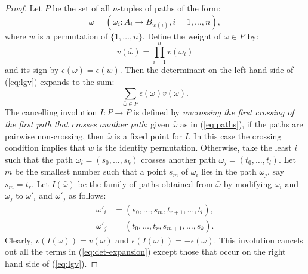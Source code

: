 \documentclass[11pt]{amsart}
\theoremstyle{definition}
\theoremstyle{example}
\begin{document}
\begin{proof}
  Let $P$ be the set of all $n$-tuples of paths of the form:
  \begin{equation}
    \label{eq:paths}
    \bar\omega = (\omega_i:A_i\to B_{w(i)}, i=1,\dotsc, n),
  \end{equation}
  where $w$ is a permutation of $\{1,\dotsc, n\}$.
  Define the weight of $\bar \omega\in P$ by:
  \begin{displaymath}
    v(\bar\omega) = \prod_{i=1}^n v(\omega_i)
  \end{displaymath}
  and its sign by $\epsilon(\bar\omega)=\epsilon(w)$.
  Then the determinant on the left hand side of (\ref{eq:lgv}) expands to the sum:
  \begin{equation}
    \label{eq:det-expansion}
    \sum_{\bar\omega\in P} \epsilon(\bar\omega)v(\bar\omega).
  \end{equation}
  The cancelling involution $I:P\to P$ is defined by \emph{uncrossing the first crossing of the first path that crosses another path}: given $\bar\omega$ as in (\ref{eq:paths}), if the paths are pairwise non-crossing, then $\bar\omega$ is a fixed point for $I$.
  In this case the crossing condition implies that $w$ is the identity permutation.
  Otherwise, take the least $i$ such that the path $\omega_i=(s_0,\dotsc,s_k)$ crosses another path $\omega_j=(t_0,\dotsc,t_l)$.
  Let $m$ be the smallest number such that a point $s_m$ of $\omega_i$ lies in the path $\omega_j$, say $s_m=t_r$.
  Let $I(\bar\omega)$ be the family of paths obtained from $\bar\omega$ by modifying $\omega_i$ and $\omega_j$ to $\omega'_i$ and $\omega'_j$ as follows:
  \begin{align*}
    \omega'_i & = (s_0,\dotsc, s_m, t_{r+1}, \dotsc, t_l),\\
    \omega'_j & = (t_0,\dotsc, t_r, s_{m+1}, \dotsc, s_k).
  \end{align*}
  Clearly, $v(I(\bar\omega)) = v(\bar\omega)$ and $\epsilon(I(\bar\omega)) = - \epsilon(\bar\omega)$.
  This involution cancels out all the terms in (\ref{eq:det-expansion}) except those that occur on the right hand side of (\ref{eq:lgv}).
\end{proof}
\end{document}
